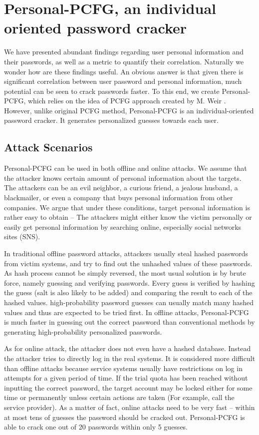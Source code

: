 \section{Personal-PCFG, an individual oriented password cracker}
\label{personalpcfg}
We have presented abundant findings regarding user personal information and their passwords, as well as a metric to quantify their correlation. Naturally we wonder how are these findings useful. An obvious answer is that given there is significant correlation between user password and personal information, much potential can be seen to crack passwords faster. To this end, we create Personal-PCFG, which relies on the idea of PCFG approach created by M. Weir \cite{weir2009password}. However, unlike original PCFG method, Personal-PCFG is an individual-oriented password cracker. It generates personalized guesses towards each user.

\subsection{Attack Scenarios}
Personal-PCFG can be used in both offline and online attacks. We assume that the attacker knows certain amount of personal information about the targets. The attackers can be an evil neighbor, a curious friend, a jealous husband, a blackmailer, or even a company that buys personal information from other companies. We argue that under these conditions, target personal information is rather easy to obtain -- The attackers might either know the victim personally or easily get personal information by searching online, especially social networks sites (SNS). 

In traditional offline password attacks, attackers usually steal hashed passwords from victim systems, and try to find out the unhashed values of these passwords. As hash process cannot be simply reversed, the most usual solution is by brute force, namely guessing and verifying passwords. Every guess is verified by hashing the guess (salt is also likely to be added) and comparing the result to each of the hashed values. high-probability password guesses can usually match many hashed values and thus are expected to be tried first. In offline attacks, Personal-PCFG is much faster in guessing out the correct password than conventional methods by generating high-probability personalized passwords.

As for online attack, the attacker does not even have a hashed database. Instead the attacker tries to directly log in the real systems. It is considered more difficult than offline attacks because service systems usually have restrictions on log in attempts for a given period of time. If the trial quota has been reached without inputting the correct password, the target account may be locked either for some time or permanently unless certain actions are taken (For example, call the service provider). As a matter of fact, online attacks need to be very fast -- within at most tens of guesses the password should be cracked out. Personal-PCFG is able to crack one out of 20 passwords within only 5 guesses. 

